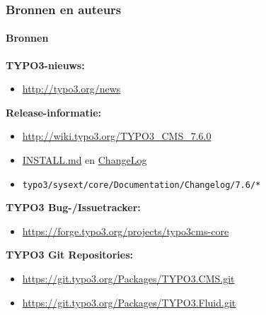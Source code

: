\begin{frame}[fragile]
	\frametitle{Bronnen en auteurs}
	\framesubtitle{Bronnen}

	\textbf{TYPO3-nieuws:}
		\begin{itemize}\smaller
			\item \url{http://typo3.org/news}
		\end{itemize}

	\textbf{Release-informatie:}
		\begin{itemize}\smaller
			\item \url{http://wiki.typo3.org/TYPO3_CMS_7.6.0}
			\item \href{https://github.com/TYPO3/TYPO3.CMS/blob/master/INSTALL.md}{INSTALL.md} en \href{https://github.com/TYPO3/TYPO3.CMS/blob/master/ChangeLog}{ChangeLog}
			\item \texttt{typo3/sysext/core/Documentation/Changelog/7.6/*}
		\end{itemize}

	\textbf{TYPO3 Bug-/Issuetracker:}
		\begin{itemize}\smaller
			\item \url{https://forge.typo3.org/projects/typo3cms-core}
		\end{itemize}

	\textbf{TYPO3 Git Repositories:}
		\begin{itemize}\smaller
			\item \url{https://git.typo3.org/Packages/TYPO3.CMS.git}
			\item \url{https://git.typo3.org/Packages/TYPO3.Fluid.git}
		\end{itemize}

\end{frame}


